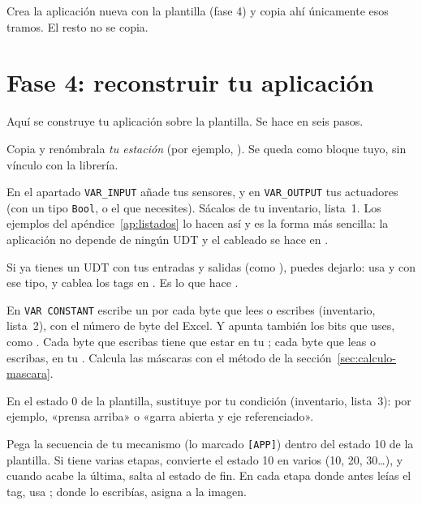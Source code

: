 Crea la aplicación nueva con la plantilla (fase 4) y copia ahí únicamente esos tramos. El resto no se copia.


\section{Fase 4: reconstruir tu aplicación}\label{sec:fase4}
Aquí se construye tu aplicación sobre la plantilla. Se hace en seis pasos.

\reiniciapaso
{}
Copia  y renómbrala \emph{tu estación} (por ejemplo, ). Se queda como bloque tuyo, sin vínculo con la librería.

En el apartado \texttt{VAR\_INPUT} añade tus sensores, y en \texttt{VAR\_OUTPUT} tus actuadores (con un tipo \texttt{Bool}, o el que necesites). Sácalos de tu inventario, lista~1. Los ejemplos del apéndice~\ref{ap:listados} lo hacen así y es la forma más sencilla: la aplicación no depende de ningún UDT y el cableado se hace en .

\begin{consejo}
Si ya tienes un UDT con tus entradas y salidas (como ), puedes dejarlo: usa  y  con ese tipo, y cablea los tags en . Es lo que hace .
\end{consejo}

En \texttt{VAR CONSTANT} escribe un  por cada byte que lees o escribes (inventario, lista~2), con el número de byte del Excel. Y apunta también los bits que uses, como . Cada byte que escribas tiene que estar en tu ; cada byte que leas o escribas, en tu . Calcula las máscaras con el método de la sección~\ref{sec:calculo-mascara}.

En el estado 0 de la plantilla, sustituye  por tu condición (inventario, lista~3): por ejemplo, «prensa arriba» o «garra abierta y eje referenciado».

Pega la secuencia de tu mecanismo (lo marcado \texttt{[APP]}) dentro del estado 10 de la plantilla. Si tiene varias etapas, convierte el estado 10 en varios (10, 20, 30\dots), y cuando acabe la última, salta al estado de fin. En cada etapa donde antes leías el tag, usa ; donde lo escribías, asigna a la imagen.

